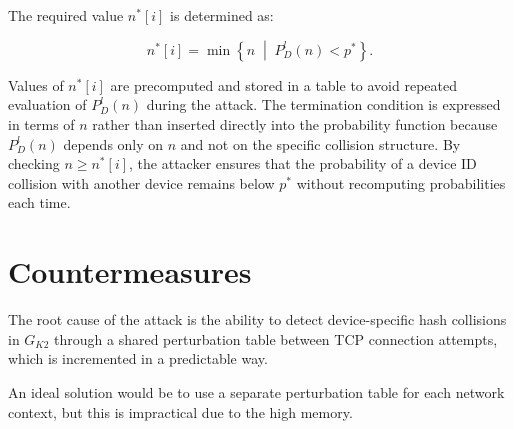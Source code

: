 \documentclass[twocolumn]{report}
\begin{document}
The required value \( n^*[i] \) is determined as:

\begin{minipage}{\columnwidth}
  \[
n^*[i]
=
\min
\left\{
n
\;\middle|\;
P_D^l(n)
<
p^*
\right\}.
\]
\end{minipage}

Values of \( n^*[i] \) are \alert{precomputed} and stored in a table to avoid repeated evaluation of \( P^l_D(n) \) during the attack. The termination condition is expressed in terms of \( n \) rather than inserted directly into the probability function because \( P^l_D(n) \) depends only on \( n \) and \alert{not on the specific collision structure}. By checking \( n \ge n^*[i] \), the attacker ensures that the probability of a device ID collision with another device remains below \( p^* \) \alert{without recomputing probabilities} each time.

\vspace{0.2cm}


\section{Countermeasures}
\label{sec:countermeasures}

The \alert{root cause} of the attack is the ability to detect device-specific hash collisions in $G_{K2}$ through a shared perturbation table between TCP connection attempts, which is incremented in a predictable way.

An \alert{ideal solution} would be to use a separate perturbation table for each network context, but this is impractical due to the high memory.%
\end{document}
